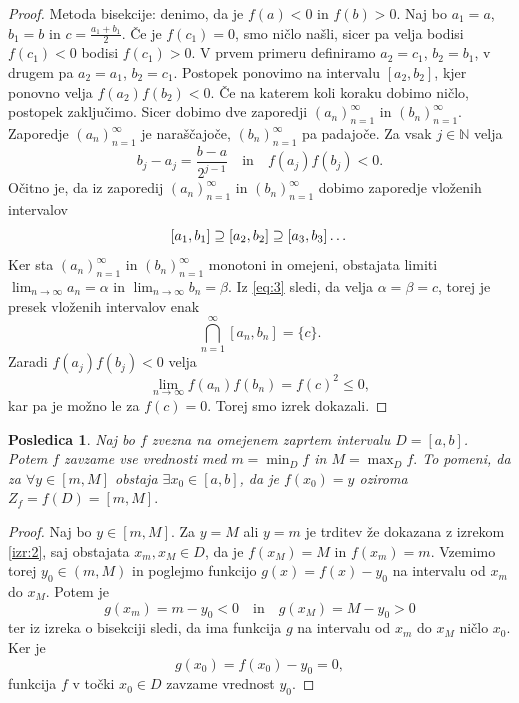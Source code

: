 \documentclass[10pt, a4paper]{article}
\newtheorem{posledica}[izr]{Posledica}
\newenvironment{noticeC}{%
  \tcolorbox[%
  notitle,
  empty,
  enhanced,  %
  breakable,
  coltext=black, 
  fontupper=\rmfamily,
  noparskip,
  sharp corners,
  boxrule=-1pt,  %
  frame hidden,
  left=7pt,  %
  right=7pt,
  top=5pt,
  bottom=5pt,
  before skip=2.5ex plus 2pt,
  after skip=2.5ex plus 2pt,
  overlay unbroken and last={%
  },
  ]}
{\endtcolorbox}
\newenvironment{dokaz}%
  {\begin{noticeC}\begin{proof}}%
  {\end{proof}\end{noticeC}}
\newcommand{\N}{\mathbb {N}}
\newcommand{\zap}[1]{(#1_n)_{n=1} ^{\infty}}
\newcommand{\limzap}[1]{\lim_{n \to \infty} {#1}}
\begin{document}
\begin{dokaz}
    Metoda bisekcije: denimo, da je $f(a) < 0$ in $f(b) > 0$. Naj bo $a_1 = a$, $b_1 = b$ in $c = \frac{a_1 + b_1}{2}$. 
    Če je $f(c_1) = 0$, smo ničlo našli, sicer pa velja bodisi $f(c_1) < 0$ bodisi $f(c_1) > 0$.
    V prvem primeru definiramo $a_2 = c_1$, $b_2 = b_1$, v drugem pa $a_2 = a_1$, $b_2 = c_1$.
    Postopek ponovimo na intervalu $[a_2, b_2]$, kjer ponovno velja $f(a_2) f(b_2) < 0.$ Če na katerem koli koraku dobimo ničlo, postopek zaključimo. 
    Sicer dobimo dve zaporedji $\zap{a}$ in $\zap{b}$.
    Zaporedje $\zap{a}$ je naraščajoče, $\zap{b}$ pa padajoče. Za vsak $j \in \N$ velja
    \begin{equation}
        \label{eq:3}
        b_j - a_j = \frac{b-a}{2^{j-1}} \quad \text{in} \quad f(a_j) f(b_j) < 0.
    \end{equation}
    Očitno je, da iz zaporedij $\zap{a}$ in $\zap{b}$ dobimo zaporedje vloženih intervalov
    $$[a_1, b_1] \mathrel{{\reflectbox{$\subseteq$}}} [a_2, b_2] \mathrel{{\reflectbox{$\subseteq$}}} [a_3 , b_3] \dots$$
    Ker sta $\zap{a}$ in $\zap{b}$ monotoni in omejeni, obstajata limiti $\limzap{a_n} = \alpha$ in $\limzap{b_n} = \beta$.
    Iz \eqref{eq:3} sledi, da velja $\alpha = \beta = c$, torej je presek vloženih intervalov enak $$\bigcap_{n = 1} ^{\infty} [a_n, b_n] = \{c\}.$$
    Zaradi $f(a_j) f(b_j) < 0$ velja $$\limzap{f(a_n) f(b_n)} = f(c)^2 \leq 0,$$ kar pa je možno le za $f(c) = 0$. Torej smo izrek dokazali.
\end{dokaz}

\begin{posledica}
    Naj bo $f$ zvezna na omejenem zaprtem intervalu $D = [a,b]$. Potem $f$ zavzame vse vrednosti med $m = \min_D f$ in $M = \max_D f.$ 
    To pomeni, da za $\forall y \in [m, M]$ obstaja $\exists x_0 \in [a,b]$, da je $f(x_0) = y$ oziroma 
    $Z_f = f(D) = [m, M].$
\end{posledica}

\begin{dokaz}
    Naj bo $y \in [m, M]$. Za $y = M$ ali $y = m$ je trditev že dokazana z izrekom \ref{izr:2}, 
    saj obstajata $x_m, x_M \in D$, da je $f(x_M) = M$ in $f(x_m) = m$.
    Vzemimo torej $y_0 \in (m,M)$ in poglejmo funkcijo $g(x) = f(x) - y_0$ na intervalu od $x_m$ do $x_M$. 
    Potem je $$g(x_m) = m - y_0 < 0 \quad \text{in} \quad g(x_M) = M - y_0 > 0$$ ter iz izreka o bisekciji sledi, da ima funkcija $g$ na intervalu od $x_m$ do $x_M$ ničlo $x_0$.
    Ker je $$g(x_0) = f(x_0) - y_0 = 0,$$ funkcija $f$ v točki $x_0 \in D$ zavzame vrednost $y_0$.
\end{dokaz}
\end{document}

